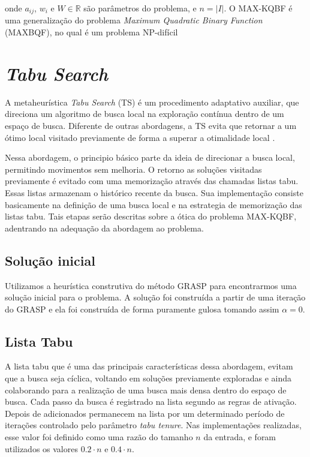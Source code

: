 \documentclass[brazilian,12pt]{article}
\begin{document}
onde $a_{ij}$, $w_i$ e $W \in \mathbb{R}$ são parâmetros do problema, e $n = |I|$. O MAX-KQBF é uma generalização do problema \textit{Maximum Quadratic Binary Function} (MAXBQF), no qual é um problema NP-difícil \cite{NPHARD}

\section{\textit{Tabu Search}}

A metaheurística \textit{Tabu Search} (TS) é um procedimento adaptativo auxiliar, que direciona um algoritmo de busca local na exploração contínua dentro de um espaço de busca. Diferente de outras abordagens, a TS evita que retornar a um ótimo local visitado previamente de forma a superar a otimalidade local \cite{ts}.

Nessa abordagem, o principio básico parte da ideia de direcionar a busca local, permitindo movimentos sem melhoria. O retorno as soluções visitadas previamente é evitado com uma memorização através das chamadas listas tabu. Essas listas armazenam o histórico recente da busca. Sua implementação consiste basicamente na definição de uma busca local e na estrategia de memorização das listas tabu. Tais etapas serão descritas sobre a ótica do problema MAX-KQBF, adentrando na adequação da abordagem ao problema. 

\subsection{Solução inicial}
  Utilizamos a heurística construtiva do método GRASP para encontrarmos uma solução inicial para o problema. A solução foi construída a partir de uma iteração do GRASP e ela foi construída de forma puramente gulosa tomando assim $ \alpha = 0$.

\subsection{Lista Tabu}
    A lista tabu que é uma das principais características dessa abordagem, evitam que a busca seja cíclica, voltando em soluções previamente exploradas e ainda colaborando para a realização de uma busca mais densa dentro do espaço de busca. Cada passo da busca é registrado na lista segundo as regras de ativação. Depois de adicionados permanecem na lista por um determinado período de iterações controlado pelo parâmetro \textit{tabu tenure}. Nas implementações realizadas, esse valor foi definido como uma razão do tamanho $n$ da entrada, e foram utilizados os valores $0.2 \cdot n$ e $0.4 \cdot n$.
    
\end{document}

